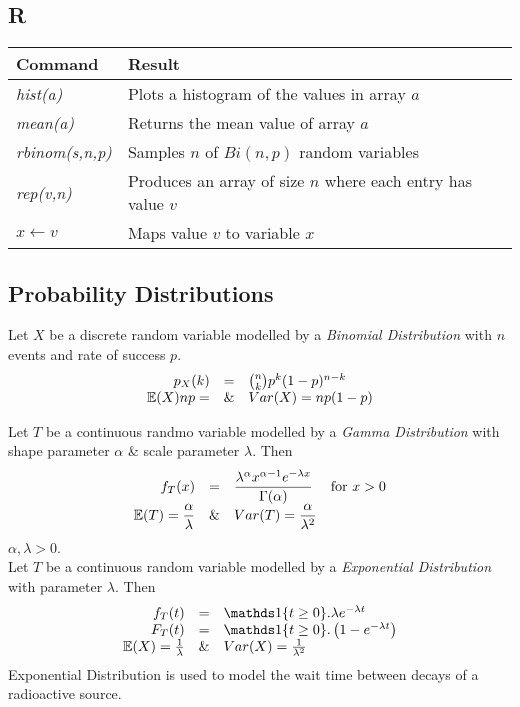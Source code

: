 \documentclass[11pt,a4paper]{article}
\begin{document}
\subsection{R}
\begin{tabular}{|l|l|}
\hline
Command&Result\\
\hline
\textit{hist(a)}&Plots a histogram of the values in array $a$\\
\textit{mean(a)}&Returns the mean value of array $a$\\
\textit{rbinom(s,n,p)}&Samples $n$ of $Bi(n,p)$ random variables\\
\textit{rep(v,n)}&Produces an array of size $n$ where each entry has value $v$\\
$x\leftarrow v$&Maps value $v$ to variable $x$\\
\hline
\end{tabular}

\subsection{Probability Distributions}

Let $X$ be a discrete random variable modelled by a \textit{Binomial Distribution} with $n$ events and rate of success $p$.\\
\[\begin{array}{rcl}
p_X(k)&=&{n\choose k}p^k(1-p)^{n-k}\\
\mathbb{E}(X)np=&\&&Var(X)=np(1-p)
\end{array}\]

Let $T$ be a continuous randmo variable modelled by a \textit{Gamma Distribution} with shape parameter $\alpha$ \& scale parameter $\lambda$. Then
\[\begin{array}{rcll}
f_T(x)&=&\dfrac{\lambda^\alpha x^{\alpha-1}e^{-\lambda x}}{\Gamma(\alpha)}&\mathrm{for\ }x>0\\
\mathbb{E}(T)=\dfrac{\alpha}{\lambda}&\&&Var(T)=\dfrac{\alpha}{\lambda^2}
\end{array}\]
\nb $\alpha,\lambda>0$.\\

Let $T$ be a continuous random variable modelled by a \textit{Exponential Distribution} with parameter $\lambda$. Then
\[\begin{array}{rcl}
f_T(t)&=&\indicator\{t\geq0\}.\lambda e^{-\lambda t}\\
F_T(t)&=&\indicator\{t\geq0\}.\left(1-e^{-\lambda t}\right)\\
\expect(X)=\frac{1}{\lambda}&\&&Var(X)=\frac{1}{\lambda^2}
\end{array}\]
\nb Exponential Distribution is used to model the wait time between decays of a radioactive source.\\
\end{document}

